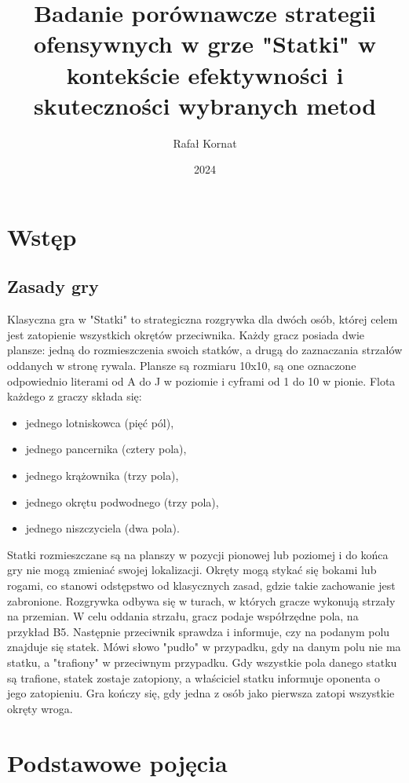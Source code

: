 \documentclass[magisterska]{pracadypl}
\author{Rafał Kornat}
\title{Badanie porównawcze strategii ofensywnych w grze "Statki" w kontekście efektywności i skuteczności wybranych metod}
\date{2024}
\begin{document}
\maketitle
\tableofcontents
\newpage


\chapter{Wstęp}

\section{Zasady gry}
Klasyczna gra w "Statki" to strategiczna rozgrywka dla dwóch osób, której 
celem jest zatopienie wszystkich okrętów przeciwnika. 
Każdy gracz posiada dwie plansze: jedną do rozmieszczenia swoich statków, a drugą do zaznaczania strzałów oddanych w stronę rywala. 
Plansze są rozmiaru 10x10, są one oznaczone odpowiednio literami od A do J w poziomie i cyframi od 1 do 10 w pionie.
Flota każdego z graczy składa się: 
\begin{itemize}
  \item jednego lotniskowca (pięć pól), 
  \item jednego pancernika (cztery pola), 
  \item jednego krążownika (trzy pola),
  \item jednego okrętu podwodnego (trzy pola),
  \item jednego niszczyciela (dwa pola).
\end{itemize}
Statki rozmieszczane są na planszy w pozycji pionowej lub poziomej i do końca gry nie mogą zmieniać swojej lokalizacji. 
Okręty mogą stykać się bokami lub rogami, co stanowi odstępstwo od klasycznych zasad, gdzie takie zachowanie jest zabronione.
Rozgrywka odbywa się w turach, w których gracze wykonują strzały na przemian.
W celu oddania strzału, gracz podaje współrzędne pola, na przykład B5. 
Następnie przeciwnik sprawdza i informuje, czy na podanym polu znajduje się statek.
Mówi słowo "pudło" w przypadku, gdy na danym polu nie ma statku, a "trafiony" w przeciwnym przypadku.
Gdy wszystkie pola danego statku są trafione, statek zostaje zatopiony, a właściciel statku informuje oponenta o jego zatopieniu.
Gra kończy się, gdy jedna z osób jako pierwsza zatopi wszystkie okręty wroga.


\chapter{Podstawowe pojęcia}
\end{document}
